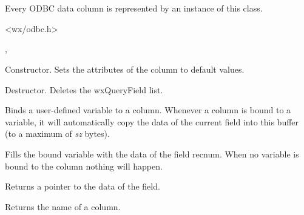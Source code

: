 \section{}\label{wxquerycol}

Every ODBC data column is represented by an instance of this class.




<wx/odbc.h>


, 




Constructor. Sets the attributes of the column to default values.



Destructor. Deletes the wxQueryField list.



Binds a user-defined variable to a column. Whenever a column is bound to a
variable, it will automatically copy the data of the current field into this
buffer (to a maximum of {\it sz} bytes).



Fills the bound variable with the data of the field recnum. When no variable
is bound to the column nothing will happen.



Returns a pointer to the data of the field.



Returns the name of a column.
  
